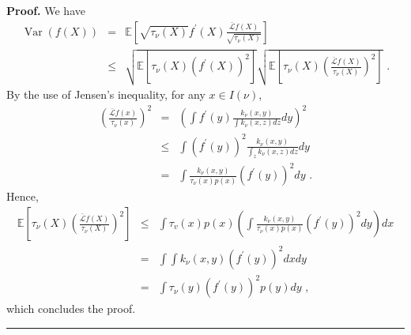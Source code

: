 \documentclass[11pt]{article}
\newenvironment{proof}[1][Proof]{\noindent\textbf{#1.} }{\ \rule{0.5em}{0.5em}}
\DeclareMathOperator{\var}{Var}
\begin{document}
\begin{proof}
We have%
\begin{eqnarray*}
\var%
\left( f\left( X\right) \right) &=&\mathbb{E}\left[ \sqrt{\tau _{\nu }\left(
X\right) }f^{\prime }\left( X\right) \frac{\mathcal{\bar{L}}f\left( X\right) 
}{\sqrt{\tau _{\nu }\left( X\right) }}\right] \\
&\leq &\sqrt{\mathbb{E}\left[ \tau _{\nu }\left( X\right) \left( f^{\prime
}\left( X\right) \right) ^{2}\right] }\sqrt{\mathbb{E}\left[ \tau _{\nu
}\left( X\right) \left( \frac{\mathcal{\bar{L}}f\left( X\right) }{\tau _{\nu
}\left( X\right) }\right) ^{2}\right] }\text{ .}
\end{eqnarray*}%
By the use of Jensen's inequality, for any $x\in I\left( \nu \right) $,%
\begin{eqnarray*}
\left( \frac{\mathcal{\bar{L}}f\left( x\right) }{\tau _{\nu }\left( x\right) 
}\right) ^{2} &=&\left( \int f^{\prime }\left( y\right) \frac{k_{\nu }\left(
x,y\right) }{\int k_{\nu }\left( x,z\right) dz}dy\right) ^{2} \\
&\leq &\int \left( f^{\prime }\left( y\right) \right) ^{2}\frac{k_{\nu
}\left( x,y\right) }{\int_{z}k_{\nu }\left( x,z\right) dz}dy \\
&=&\int \frac{k_{\nu }\left( x,y\right) }{\tau _{\nu }\left( x\right)
p\left( x\right) }\left( f^{\prime }\left( y\right) \right) ^{2}dy\text{ .}
\end{eqnarray*}%
Hence,%
\begin{eqnarray*}
\mathbb{E}\left[ \tau _{\nu }\left( X\right) \left( \frac{\mathcal{\bar{L}}%
f\left( X\right) }{\tau _{\nu }\left( X\right) }\right) ^{2}\right] &\leq
&\int \tau _{v}\left( x\right) p\left( x\right) \left( \int \frac{k_{\nu
}\left( x,y\right) }{\tau _{\nu }\left( x\right) p\left( x\right) }\left(
f^{\prime }\left( y\right) \right) ^{2}dy\right) dx \\
&=&\int \int k_{\nu }\left( x,y\right) \left( f^{\prime }\left( y\right)
\right) ^{2}dxdy \\
&=&\int \tau _{\nu }\left( y\right) \left( f^{\prime }\left( y\right)
\right) ^{2}p\left( y\right) dy\text{ ,}
\end{eqnarray*}%
which concludes the proof.
\end{proof}
\end{document}
